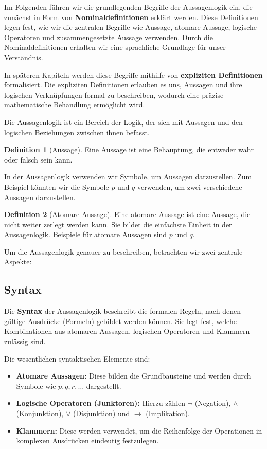 \documentclass{book}
\theoremstyle{plain}
\theoremstyle{remark}
\theoremstyle{definition}
\newtheorem{definition}{Definition}[section]
\begin{document}
Im Folgenden führen wir die grundlegenden Begriffe der Aussagenlogik ein, die zunächst in Form von \textbf{Nominaldefinitionen} erklärt werden. Diese Definitionen legen fest, wie wir die zentralen Begriffe wie Aussage, atomare Aussage, logische Operatoren und zusammengesetzte Aussage verwenden. Durch die Nominaldefinitionen erhalten wir eine sprachliche Grundlage für unser Verständnis.

In späteren Kapiteln werden diese Begriffe mithilfe von \textbf{expliziten Definitionen} formalisiert. Die expliziten Definitionen erlauben es uns, Aussagen und ihre logischen Verknüpfungen formal zu beschreiben, wodurch eine präzise mathematische Behandlung ermöglicht wird.

Die Aussagenlogik ist ein Bereich der Logik, der sich mit Aussagen und den logischen Beziehungen zwischen ihnen befasst.

\begin{definition}[Aussage]
Eine Aussage ist eine Behauptung, die entweder wahr oder falsch sein kann.
\end{definition}

In der Aussagenlogik verwenden wir Symbole, um Aussagen darzustellen. Zum Beispiel könnten wir die Symbole \(p\) und \(q\) verwenden, um zwei verschiedene Aussagen darzustellen.

\begin{definition}[Atomare Aussage]
Eine atomare Aussage ist eine Aussage, die nicht weiter zerlegt werden kann. Sie bildet die einfachste Einheit in der Aussagenlogik. Beispiele für atomare Aussagen sind \(p\) und \(q\).
\end{definition}


Um die Aussagenlogik genauer zu beschreiben, betrachten wir zwei zentrale Aspekte:

\subsection{Syntax}

Die \textbf{Syntax} der Aussagenlogik beschreibt die formalen Regeln, nach denen gültige Ausdrücke (Formeln) gebildet werden können. Sie legt fest, welche Kombinationen aus atomaren Aussagen, logischen Operatoren und Klammern zulässig sind.

Die wesentlichen syntaktischen Elemente sind:
\begin{itemize}
    \item \textbf{Atomare Aussagen:} Diese bilden die Grundbausteine und werden durch Symbole wie \(p, q, r, \dots\) dargestellt.
    \item \textbf{Logische Operatoren (Junktoren):} Hierzu zählen \(\neg\) (Negation), \(\land\) (Konjunktion), \(\lor\) (Disjunktion) und \(\rightarrow\) (Implikation).
    \item \textbf{Klammern:} Diese werden verwendet, um die Reihenfolge der Operationen in komplexen Ausdrücken eindeutig festzulegen.
\end{itemize}
\end{document}
